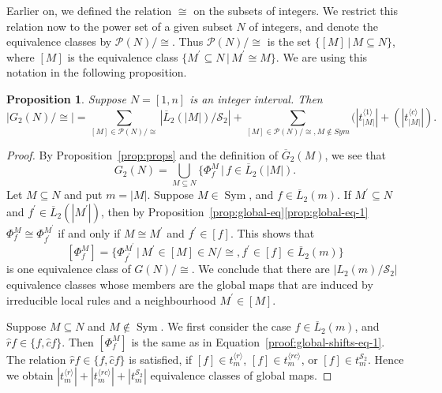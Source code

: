 \documentclass[a4paper]{article}
\newcommand{\Sym}{\mathop{\mathrm{Sym}}}
\newtheorem{prop}{Proposition}
\begin{document}
Earlier on, we defined the relation $\cong$ on the subsets of integers.
We restrict this relation now to the power set of a given subset $N$ of integers, and denote the equivalence
classes by $\mathcal{P}(N)/{\cong}$.
Thus $\mathcal{P}(N)/{\cong}$ is the set $ \{ [M] \, | \, M \subseteq N \}$, where $[M]$ is the equivalence
class $\{ M^\prime \subseteq N \, | \, M^\prime \cong M \}$.
We are using this notation in the following proposition.
\begin{prop}
\label{prop:global-shift}
Suppose $N = [1, n]$ is an integer interval. Then
\[
|G_2(N)/{\cong}| = \sum_{[M]\in \mathcal{P}(N)/{\cong}} |\overline{L}_2(|M|)/\mathcal{S}_2| +
      \sum_{[M]\in \mathcal{P}(N)/{\cong}, M \not\in Sym} (|t_{|M|}^{\langle 1 \rangle}| + (|t_{|M|}^{\langle c \rangle}|).
\]
\end{prop}
\begin{proof}
By Proposition~\ref{prop:props} and the definition of $\overline{G}_2(M)$, we see that
\[
G_2(N) = \bigcup_{M\subseteq N} \{ \Phi^M_f \, | \, f \in \overline{L}_2(|M|).
\]
Let $M \subseteq N$ and put $m=|M|$.
Suppose $M \in \Sym$, and $f \in \overline{L}_2(m)$.
If $M^\prime \subseteq N$ and $f^\prime \in \overline L_2(|M^\prime|)$,
then by Proposition~\ref{prop:global-eq}\ref{prop:global-eq-1}
$\Phi^M_f \cong \Phi^{M^\prime}_{f^\prime}$ if and only if
$M \cong M^\prime$ and $f^\prime \in [f]$.
This shows that
\begin{equation}
\label{proof:global-shifts-eq-1}
[\Phi^M_f] = \{ \Phi^{M^\prime}_{f^\prime} \, | \, M^\prime \in [M] \in N / {\cong},
f^\prime \in [f] \in \overline{L}_2(m)  \}
\end{equation}
 is one equivalence class of $G(N) / {\cong}$.
We conclude that there are $|L_2(m) / \mathcal{S}_2| $ equivalence classes whose members are the global maps
that are induced by irreducible local rules and a neighbourhood $M^\prime \in [M]$.


Suppose $M \subseteq N$ and $M \not\in \Sym$.
We first consider the case $f \in \overline{L}_2(m)$, and $\hat{r}f \in \{f, \hat{c}f \}$.
Then $[\Phi^M_f]$ is the same as in Equation~\ref{proof:global-shifts-eq-1}.
The relation $\hat{r}f \in \{f, \hat{c}f \}$ is satisfied, if
$[f] \in t^{\langle r \rangle}_{m}$, $[f] \in t^{\langle rc \rangle}_{m}$,
or $[f] \in t^{\mathcal{S}_2}_{m}$.
Hence we obtain $|t^{\langle r \rangle}_{m}| + |t^{\langle rc \rangle}_{m}|
+ |t^{\mathcal{S}_2}_{m}|$ equivalence classes of global maps.


\end{proof}
\end{document}
